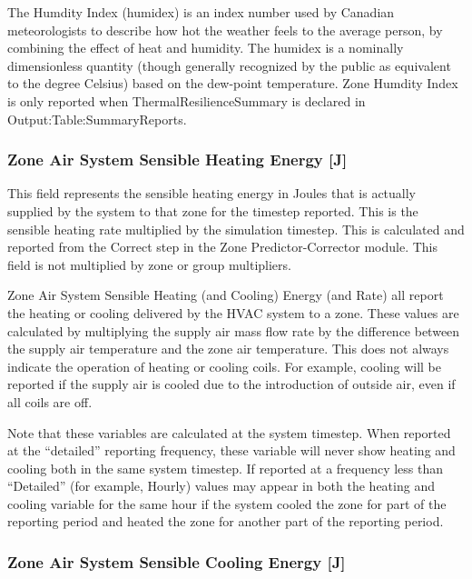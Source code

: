 The Humdity Index (humidex) is an index number used by Canadian meteorologists to describe how hot the weather feels to the average person, by combining the effect of heat and humidity. The humidex is a nominally dimensionless quantity (though generally recognized by the public as equivalent to the degree Celsius) based on the dew-point temperature. Zone Humdity Index is only reported when ThermalResilienceSummary is declared in Output:Table:SummaryReports.  

\subsubsection{Zone Air System Sensible Heating Energy {[}J{]}}\label{zone-air-system-sensible-heating-energy-j-1}

This field represents the sensible heating energy in Joules that is actually supplied by the system to that zone for the timestep reported. This is the sensible heating rate multiplied by the simulation timestep. This is calculated and reported from the Correct step in the Zone Predictor-Corrector module. This field is not multiplied by zone or group multipliers.

\begin{callout}
Zone Air System Sensible Heating (and Cooling) Energy (and Rate) all report the heating or cooling delivered by the HVAC system to a zone. These values are calculated by multiplying the supply air mass flow rate by the difference between the supply air temperature and the zone air temperature. This does not always indicate the operation of heating or cooling coils. For example, cooling will be reported if the supply air is cooled due to the introduction of outside air, even if all coils are off.

Note that these variables are calculated at the system timestep. When reported at the ``detailed'' reporting frequency, these variable will never show heating and cooling both in the same system timestep. If reported at a frequency less than ``Detailed'' (for example, Hourly) values may appear in both the heating and cooling variable for the same hour if the system cooled the zone for part of the reporting period and heated the zone for another part of the reporting period.
\end{callout}

\subsubsection{Zone Air System Sensible Cooling Energy {[}J{]}}\label{zone-air-system-sensible-cooling-energy-j-1}

